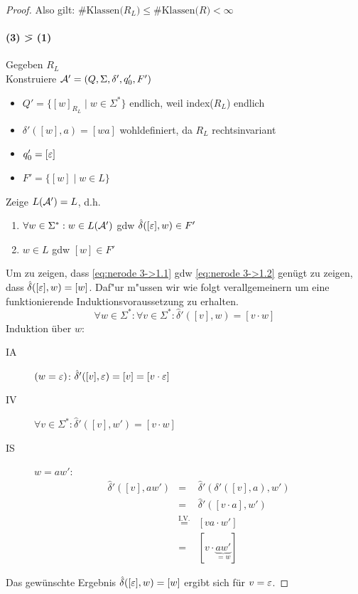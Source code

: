 \begin{proof}
Also gilt: $\text{\#Klassen($R_L$)$\leq$\#Klassen($R$)}<\infty$

\paragraph{(3) \=> (1)} Gegeben $R_L$\\
                Konstruiere $\mathcal{A}'=(Q,\Sigma,\delta',q_0',F')$
    \begin{itemize}
    \item $Q' = \{ [w]_{R_L} \mid w\in \Sigma^* \}$ \quad endlich, weil index($R_L$) endlich
    \item $\delta'([w],a) = [wa]$ wohldefiniert, da $R_L$ rechtsinvariant
    \item $q_0' = [\varepsilon]$
    \item $F' = \{ [w] \mid w\in L \}$
    \end{itemize}
    Zeige $L(\mathcal{A}')=L$, d.h.
    \begin{enumerate}
    \item \label{eq:nerode 3->1.1} $\forall w\in \Sigma^* : w\in L(\mathcal{A}')$ gdw $\hat\delta([\varepsilon],w)\in F'$
    \item \label{eq:nerode 3->1.2} $w\in L$ gdw $[w]\in F'$ 
    \end{enumerate}
    
    Um zu zeigen, dass \ref{eq:nerode 3->1.1} gdw \ref{eq:nerode 3->1.2} genügt zu zeigen, dass $\hat\delta([\varepsilon], w) = [w]$.
                Daf"ur m"ussen wir wie folgt verallgemeinern um eine funktionierende Induktionsvoraussetzung zu erhalten.
    \begin{displaymath}
      \forall w\in\Sigma^* :
                        \forall v\in\Sigma^* : \hat\delta'([v],w) = [v\cdot w]
    \end{displaymath}
    Induktion über $w$:
    \begin{description}
    \item[IA] $(w = \varepsilon)$: $\hat\delta'([v],\varepsilon) = [v]=[v\cdot\varepsilon]$
    \item[IV] 
      $\forall v\in\Sigma^* : \hat\delta'([v],w') = [v\cdot w]$
    \item [IS] $w = aw'$:
      \begin{displaymath}
        \begin{array}{lcl}
        \hat\delta'([v],aw') &=& \hat\delta'(\delta'([v],a),w') \\
                             &=& \hat\delta'([v\cdot a],w') \\
                             &\stackrel{\text{I.V.}}{=}&[va\cdot w'] \\
                             &=& [v\cdot \underbrace{aw'}_{=w}]
        \end{array}
      \end{displaymath}
    \end{description}
                Das gewünschte Ergebnis $\hat\delta([\varepsilon], w) = [w]$ ergibt sich für $v=\varepsilon$. \qedhere
\end{proof}
